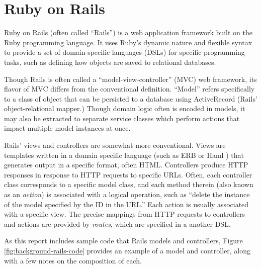 \documentclass[document.tex]{subfiles}
\begin{document}
\section {Ruby on Rails}

Ruby on Rails \cite{rails} (often called ``Rails'') is a web application framework built on the Ruby programming language. It uses Ruby's dynamic nature and flexible syntax to provide a set of domain-specific languages (DSLs) for specific programming tasks, such as defining how objects are saved to relational databases.

Though Rails is often called a ``model-view-controller'' (MVC) web framework, its flavor of MVC differs from the conventional definition. ``Model'' refers specifically to a class of object that can be persisted to a database using ActiveRecord (Rails' object-relational mapper.) Though domain logic often is encoded in models, it may also be extracted to separate service classes which perform actions that impact multiple model instances at once.

Rails' views and controllers are somewhat more conventional. Views are templates written in a domain specific language (such as ERB \cite{erb} or Haml \cite{haml}) that generates output in a specific format, often HTML. Controllers produce HTTP responses in response to HTTP requests to specific URLs. Often, each controller class corresponds to a specific model class, and each method therein (also known as an \emph{action}) is associated with a logical operation, such as ``delete the instance of the model specified by the ID in the URL.'' Each action is usually associated with a specific view. The precise mappings from HTTP requests to controllers and actions are provided by \emph{routes}, which are specified in a another DSL.


As this report includes sample code that Rails models and controllers, Figure \ref{fig:background-rails-code} provides an example of a model and controller, along with a few notes on the composition of each.
\end{document}
